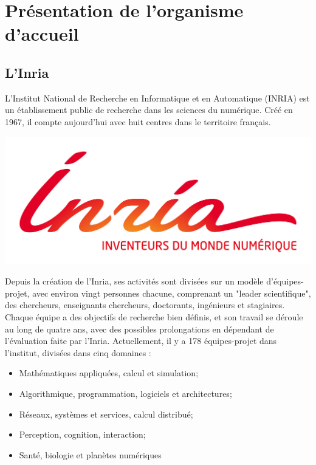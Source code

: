 \section{Présentation de l'organisme d'accueil}
\label{sec:organisme}

\subsection{L'Inria}
\label{subsec:inria}

\indent L'Institut National de Recherche en Informatique et en Automatique (INRIA) est un établissement public de recherche dans les sciences du numérique. Créé en 1967, il compte aujourd'hui avec huit centres dans le territoire français. 

\begingroup
\centering
\includegraphics[scale=.3]{figures/logos/Inria.jpg}
\endgroup

\indent Depuis la création de l'Inria, ses activités sont divisées sur un modèle d'équipes-projet, avec environ vingt personnes chacune, comprenant un "leader scientifique", des chercheurs, enseignants chercheurs, doctorants, ingénieurs et stagiaires. Chaque équipe a des objectifs de recherche bien définis, et son travail se déroule au long de quatre ans, avec des possibles prolongations en dépendant de l'évaluation faite par l'Inria. Actuellement, il y a 178 équipes-projet dans l'institut, divisées dans cinq domaines : 

\begin{itemize}
	\item Mathématiques appliquées, calcul et simulation;
	\item Algorithmique, programmation, logiciels et architectures;
	\item Réseaux, systèmes et services, calcul distribué;
	\item Perception, cognition, interaction;
	\item Santé, biologie et planètes numériques
\end{itemize}

